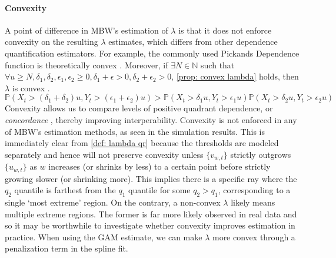 \documentclass[12pt]{article}
\begin{document}
    \paragraph{Convexity} A point of difference in MBW's estimation of $\lambda$ is that it does not enforce convexity on the resulting $\lambda$ estimates, which differs from other dependence quantification estimators. 
    For example, the commonly used Pickands Dependence function is theoretically convex \citep{Bucher2011}.
    Moreover, if $\exists N \in \mathbb{N}$ such that $\forall u \geq N, \delta_1, \delta_2, \epsilon_1, \epsilon_2 \geq 0, \delta_1 + \epsilon > 0, \delta_2 + \epsilon_2 > 0$, \cref{prop: convex lambda} holds, then $\lambda$ is convex \citep{TawnWadsworth2013}. 
    \begin{equation} \label{prop: convex lambda}
      \mathbb{P}(X_t > (\delta_1 + \delta_2) u, Y_t > (\epsilon_1 + \epsilon_2) u) >  \mathbb{P}(X_t > \delta_1 u, Y_t > \epsilon_1  u) \mathbb{P}(X_t > \delta_2 u, Y_t > \epsilon_2  u)
    \end{equation}
    Convexity allows us to compare levels of positive quadrant dependence, or \textit{concordance} \citep{TawnWadsworth2013}, thereby improving interperability. 
    Convexity is not enforced in any of MBW's estimation methods, as seen in the simulation results.
    This is immediately clear from \cref{def: lambda qr} because the thresholds are modeled separately and hence will not preserve convexity unless $\{v_{w, t}\}$ strictly outgrows $\{u_{w, t}\}$ as $w$ increases (or shrinks by less) to a certain point before strictly growing slower (or shrinking more).
    This implies there is a specific ray where the $q_2$ quantile is farthest from the $q_1$ quantile for some $q_2 > q_1$, corresponding to a single `most extreme' region.
    On the contrary, a non-convex $\lambda$ likely means multiple extreme regions.
    The former is far more likely observed in real data and so it may be worthwhile to investigate whether convexity improves estimation in practice. 
    When using the GAM estimate, we can make $\lambda$ more convex through a penalization term in the spline fit.
\end{document}
